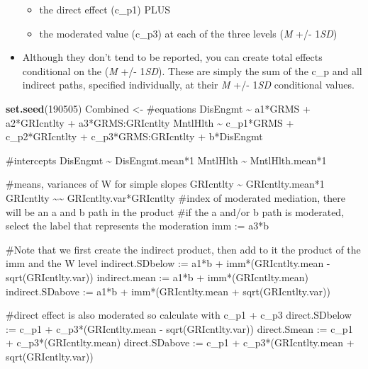 \documentclass[
  11pt,
]{book}
\newenvironment{Shaded}{\begin{snugshade}}{\end{snugshade}}
\newcommand{\DecValTok}[1]{\textcolor[rgb]{0.06,0.06,0.06}{#1}}
\newcommand{\FunctionTok}[1]{\textcolor[rgb]{0.27,0.27,0.27}{\textbf{#1}}}
\newcommand{\NormalTok}[1]{#1}
\newcommand{\OtherTok}[1]{\textcolor[rgb]{0.37,0.37,0.37}{#1}}
\newcommand{\StringTok}[1]{\textcolor[rgb]{0.5,0.5,0.5}{#1}}
\providecommand{\tightlist}{%
  \setlength{\itemsep}{0pt}\setlength{\parskip}{0pt}}
\begin{document}
\begin{itemize}
  \begin{itemize}
  \tightlist
  \item
    the direct effect (c\_p1) PLUS
  \item
    the moderated value (c\_p3) at each of the three levels (\emph{M} +/- 1\emph{SD})
  \end{itemize}
\item
  Although they don't tend to be reported, you can create total effects conditional on the (\emph{M} +/- 1\emph{SD}). These are simply the sum of the c\_p and all indirect paths, specified individually, at their \emph{M} +/- 1\emph{SD} conditional values.
\end{itemize}

\begin{Shaded}
\begin{Highlighting}[]
\FunctionTok{set.seed}\NormalTok{(}\DecValTok{190505}\NormalTok{)}
\NormalTok{Combined }\OtherTok{\textless{}{-}} \StringTok{\textquotesingle{}}
\StringTok{    \#equations}
\StringTok{    DisEngmt \textasciitilde{} a1*GRMS + a2*GRIcntlty + a3*GRMS:GRIcntlty}
\StringTok{    MntlHlth \textasciitilde{} c\_p1*GRMS + c\_p2*GRIcntlty + c\_p3*GRMS:GRIcntlty + b*DisEngmt}

\StringTok{    \#intercepts}
\StringTok{    DisEngmt \textasciitilde{} DisEngmt.mean*1}
\StringTok{    MntlHlth \textasciitilde{} MntlHlth.mean*1}

\StringTok{    \#means, variances of W for simple slopes}
\StringTok{    GRIcntlty \textasciitilde{} GRIcntlty.mean*1}
\StringTok{    GRIcntlty \textasciitilde{}\textasciitilde{} GRIcntlty.var*GRIcntlty}
\StringTok{    }
\StringTok{    \#index of moderated mediation, there will be an a and b path in the product}
\StringTok{    \#if the a and/or b path is moderated, select the label that represents the moderation}
\StringTok{    imm := a3*b}

\StringTok{    \#Note that we first create the indirect product, then add to it the product of the imm and the W level}
\StringTok{    indirect.SDbelow := a1*b + imm*(GRIcntlty.mean {-} sqrt(GRIcntlty.var))}
\StringTok{    indirect.mean := a1*b + imm*(GRIcntlty.mean)}
\StringTok{    indirect.SDabove := a1*b + imm*(GRIcntlty.mean + sqrt(GRIcntlty.var))}

\StringTok{    \#direct effect is also moderated so calculate with c\_p1 + c\_p3}
\StringTok{    direct.SDbelow := c\_p1 + c\_p3*(GRIcntlty.mean {-} sqrt(GRIcntlty.var)) }
\StringTok{    direct.Smean := c\_p1 + c\_p3*(GRIcntlty.mean)}
\StringTok{    direct.SDabove := c\_p1 + c\_p3*(GRIcntlty.mean + sqrt(GRIcntlty.var))}


\end{Highlighting}
\end{Shaded}
\end{document}
